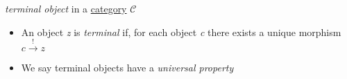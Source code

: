 \emph{terminal object} in a \href{doc/1 math/Seven Sketches in Compositionality/Chapter 3: Databases/2 Categories/1 Free Categories/1 Category}{category} $\mathcal{C}$

\begin{itemize}
    \item  An object \emph{z} is \emph{terminal} if, for each object \emph{c} there exists a unique morphism $c \xrightarrow{!} z$
    \item We say terminal objects have a \emph{universal property}
  \end{itemize}
